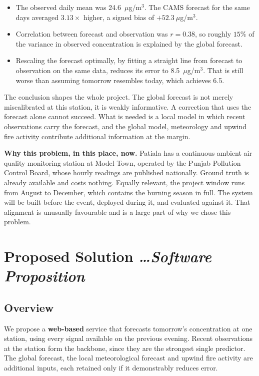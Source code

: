 \documentclass[11pt,a4paper]{article}
\newcommand{\BvrHint}[1]{%
  {\normalfont\normalsize\itshape\hfill #1}}
\newcommand{\ObsMean}{24.6}
\newcommand{\PersMAE}{6.5}
\newcommand{\CamsMAE}{52.3}
\newcommand{\CamsFitMAE}{8.5}
\newcommand{\CamsRatio}{3.13}
\newcommand{\CamsCorr}{0.38}
\begin{document}
\begin{itemize}[leftmargin=0.7cm]
  \item The observed daily mean was \ObsMean~$\mu$g/m$^3$. The
    CAMS forecast for the same days averaged
    $\CamsRatio\times$ higher, a signed bias of
    $+\CamsMAE~\mu$g/m$^3$.
  \item Correlation between forecast and observation was
    $r=\CamsCorr$, so roughly $15\%$ of the variance in observed
    concentration is explained by the global forecast.
  \item Rescaling the forecast optimally, by fitting a straight
    line from forecast to observation on the same data, reduces
    its error to \CamsFitMAE~$\mu$g/m$^3$. That is still worse
    than assuming tomorrow resembles today, which achieves
    \PersMAE.
\end{itemize}

The conclusion shapes the whole project. The global forecast is
not merely miscalibrated at this station, it is weakly
informative. A correction that uses the forecast alone cannot
succeed. What is needed is a local model in which recent
observations carry the forecast, and the global model,
meteorology and upwind fire activity contribute additional
information at the margin.

\textbf{Why this problem, in this place, now.} Patiala
has a continuous ambient air quality monitoring station
at Model Town, operated by the Punjab Pollution Control
Board, whose hourly readings are published nationally.
Ground truth is already available and costs nothing.
Equally relevant, the project window runs from August to
December, which contains the burning season in full. The
system will be built before the event, deployed during
it, and evaluated against it. That alignment is
unusually favourable and is a large part of why we chose
this problem.

\section{Proposed Solution %
\BvrHint{\ldots Software Proposition}}

\subsection{Overview}
We propose a \textbf{web-based} service that forecasts
tomorrow's concentration at one station, using every signal
available on the previous evening. Recent observations at the
station form the backbone, since they are the strongest single
predictor. The global forecast, the local meteorological
forecast and upwind fire activity are additional inputs, each
retained only if it demonstrably reduces error.
\end{document}
